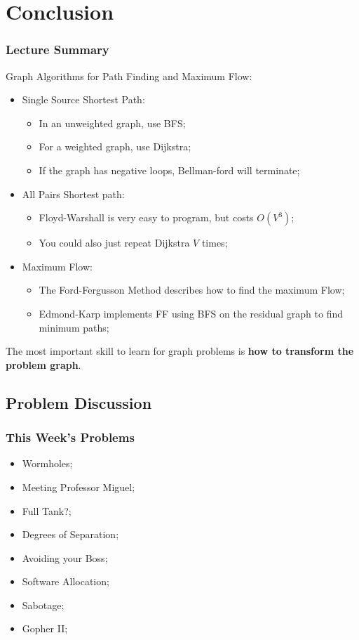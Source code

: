 \section{Conclusion}

\begin{frame}
  \frametitle{Lecture Summary}

  Graph Algorithms for Path Finding and Maximum Flow:\bigskip

  \begin{itemize}
    \item Single Source Shortest Path:
    \begin{itemize}
      \item In an unweighted graph, use BFS;
      \item For a weighted graph, use Dijkstra;
      \item If the graph has negative loops, Bellman-ford will terminate;
    \end{itemize}\medskip
    \item All Pairs Shortest path:
    \begin{itemize}
      \item Floyd-Warshall is very easy to program, but costs $O(V^3)$;
      \item You could also just repeat Dijkstra $V$ times;
    \end{itemize}\medskip
    \item Maximum Flow:
    \begin{itemize}
      \item The Ford-Fergusson Method describes how to find the maximum Flow;
      \item Edmond-Karp implements FF using BFS on the residual graph to find minimum paths;
    \end{itemize}
  \end{itemize}\bigskip

  The most important skill to learn for graph problems is {\bf how to transform the problem graph}.
\end{frame}


\subsection{Problem Discussion}

\begin{frame}
  \frametitle{This Week's Problems}
  \begin{itemize}
  \item Wormholes;
  \item Meeting Professor Miguel;
  \item Full Tank?;
  \item Degrees of Separation;
  \item Avoiding your Boss;
  \item Software Allocation;
  \item Sabotage;
  \item Gopher II;
  \end{itemize}
\end{frame}

